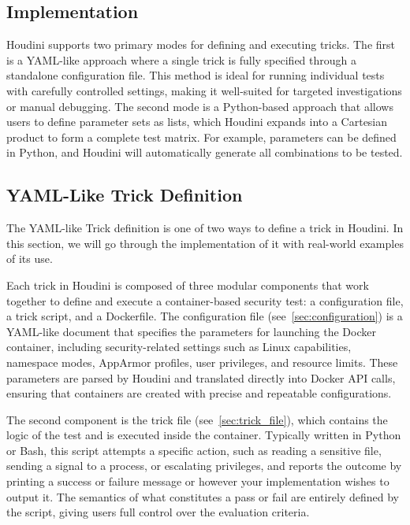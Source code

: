 \documentclass[12pt]{report}
\begin{document}
\begin{doublespace}
\chapter{Implementation}


Houdini supports two primary modes for defining and executing tricks. The first is a YAML-like approach where a single trick is fully specified through a standalone configuration file. This method is ideal for running individual tests with carefully controlled settings, making it well-suited for targeted investigations or manual debugging. The second mode is a Python-based approach that allows users to define parameter sets as lists, which Houdini expands into a Cartesian product to form a complete test matrix. For example, parameters can be defined in Python, and Houdini will automatically generate all combinations to be tested.



\section{YAML-Like Trick Definition}

The YAML-like Trick definition is one of two ways to define a trick in Houdini. In this section, we will go through the implementation of it with real-world examples of its use.

Each trick in Houdini is composed of three modular components that work together to define and execute a container-based security test: a configuration file, a trick script, and a Dockerfile. The configuration file (see~\ref{sec:configuration}) is a YAML-like document that specifies the parameters for launching the Docker container, including security-related settings such as Linux capabilities, namespace modes, AppArmor profiles, user privileges, and resource limits. These parameters are parsed by Houdini and translated directly into Docker API calls, ensuring that containers are created with precise and repeatable configurations.

The second component is the trick file (see~\ref{sec:trick_file}), which contains the logic of the test and is executed inside the container. Typically written in Python or Bash, this script attempts a specific action, such as reading a sensitive file, sending a signal to a process, or escalating privileges, and reports the outcome by printing a success or failure message or however your implementation wishes to output it. The semantics of what constitutes a pass or fail are entirely defined by the script, giving users full control over the evaluation criteria.


\end{doublespace}
\end{document}
